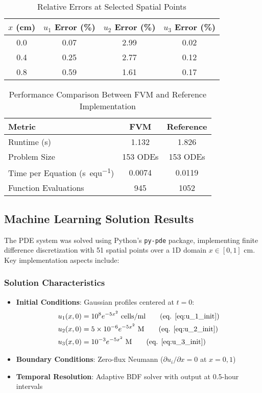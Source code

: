 \documentclass[conference]{IEEEtran}
\begin{document}
\begin{table}[H]
\centering
\caption{Relative Errors at Selected Spatial Points}
\label{tab:errors}
\begin{tabular}{cccc}
\toprule
$x$ (\si{cm}) & $u_1$ Error (\%) & $u_2$ Error (\%) & $u_3$ Error (\%) \\
\midrule
0.0 & 0.07 & 2.99 & 0.02 \\
0.4 & 0.25 & 2.77 & 0.12 \\
0.8 & 0.59 & 1.61 & 0.17 \\
\bottomrule
\end{tabular}
\end{table}

\begin{table}[H]
\centering
\caption{Performance Comparison Between FVM and Reference Implementation}
\label{tab:performance}
\begin{tabular}{lcc}
\toprule
Metric & FVM & Reference \\
\midrule
Runtime (\si{s}) & 1.132 & 1.826 \\
Problem Size & \num{153} ODEs & \num{153} ODEs \\
Time per Equation (\si{s.equ^{-1}}) & 0.0074 & 0.0119 \\
Function Evaluations & 945 & 1052 \\
\bottomrule
\end{tabular}
\end{table}

\subsection{Machine Learning Solution Results}

The PDE system was solved using Python's \texttt{py-pde} package, implementing finite difference discretization with 51 spatial points over a 1D domain $x \in [0, 1]$ cm. Key implementation aspects include:

\subsubsection{Solution Characteristics}
\begin{itemize}
    \item \textbf{Initial Conditions}: Gaussian profiles centered at $t=0$:
    \begin{align*}
        u_1(x,0) &= 10^8 e^{-5x^2} \text{ cells/ml} \tag{eq. \ref{eq:u_1_init}} \\
        u_2(x,0) &= 5\times10^{-6} e^{-5x^2} \text{ M} \tag{eq. \ref{eq:u_2_init}} \\
        u_3(x,0) &= 10^{-3} e^{-5x^2} \text{ M} \tag{eq. \ref{eq:u_3_init}}
    \end{align*}
    
    \item \textbf{Boundary Conditions}: Zero-flux Neumann ($\partial u_i/\partial x = 0$ at $x=0,1$)
    
    \item \textbf{Temporal Resolution}: Adaptive BDF solver with output at 0.5-hour intervals
\end{itemize}
\end{document}
